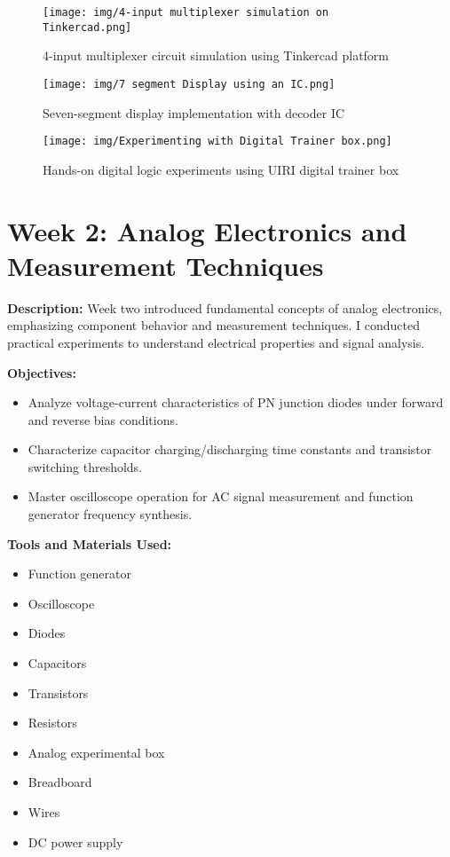 \documentclass[12pt,a4paper]{report}
\begin{document}
\begin{figure}[H]
\centering
\texttt{[image: img/4-input multiplexer simulation on Tinkercad.png]}
\caption{4-input multiplexer circuit simulation using Tinkercad platform}
\label{fig:multiplexer-sim}

\vspace{1.5em}

\begin{minipage}[t]{0.49\textwidth}
  \centering
  \texttt{[image: img/7 segment Display using an IC.png]}
  \caption{Seven-segment display implementation with decoder IC}
  \label{fig:7segment-display}
\end{minipage}
\hfill
\begin{minipage}[t]{0.49\textwidth}
  \centering
  \texttt{[image: img/Experimenting with Digital Trainer box.png]}
  \caption{Hands-on digital logic experiments using UIRI digital trainer box}
  \label{fig:digital-trainer}
\end{minipage}
\end{figure}


\newpage
\section{Week 2: Analog Electronics and Measurement Techniques}

\noindent\textbf{Description:} Week two introduced fundamental concepts of analog electronics, emphasizing component behavior and measurement techniques. I conducted practical experiments to understand electrical properties and signal analysis.

\noindent\textbf{Objectives:}
\begin{itemize}
    \item Analyze voltage-current characteristics of PN junction diodes under forward and reverse bias conditions.
    \item Characterize capacitor charging/discharging time constants and transistor switching thresholds.
    \item Master oscilloscope operation for AC signal measurement and function generator frequency synthesis.
\end{itemize}

\noindent\textbf{Tools and Materials Used:}
\begin{multicols}{2}
\begin{itemize}
    \item Function generator
    \item Oscilloscope
    \item Diodes
    \item Capacitors
    \item Transistors
    \item Resistors
    \item Analog experimental box
    \item Breadboard
    \item Wires
    \item DC power supply
\end{itemize}
\end{multicols}
\end{document}
